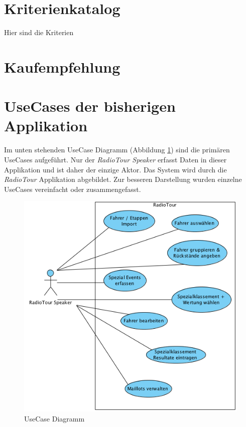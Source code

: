 \section{Kriterienkatalog}
\label{ref:kriterien}
Hier sind die Kriterien

\section{Kaufempfehlung}
\label{ref:kaufempfehlung}

\section{UseCases der bisherigen Applikation}
\label{ref:usecases}
Im unten stehenden UseCase Diagramm (Abbildung \ref{fig:usecasediagram}) sind die primären UseCases aufgeführt. Nur der \textit{RadioTour Speaker} erfasst Daten in dieser Applikation und ist daher der einzige Aktor. Das System wird durch die \textit{RadioTour} Applikation abgebildet. Zur besseren Darstellung wurden einzelne UseCases vereinfacht oder zusammengefasst.
\begin{figure}[h1]
  \caption{UseCase Diagramm}
  \label{fig:usecasediagram}
  \begin{center}
    \includegraphics[scale=0.6]{05bericht/images/usecasediagram.png}
  \end{center}
\end{figure}

